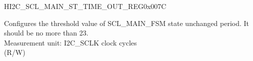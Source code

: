 \begin{register}{H}{I2C\_SCL\_MAIN\_ST\_TIME\_OUT\_REG}{0x007C}\label{regdesc:I2CSCLMAINSTTIMEOUTREG}
%
%
\regnewline%
\begin{regdesc}\begin{reglist}
\label{fielddesc:I2CSCLMAINSTTOI2C}\item [I2C\_SCL\_MAIN\_ST\_TO\_I2C] Configures the threshold value of SCL\_MAIN\_FSM state unchanged period. It should be no more than 23.\\
Measurement unit: I2C\_SCLK clock cycles \\ (R/W)
\end{reglist}\end{regdesc}
\end{register}



